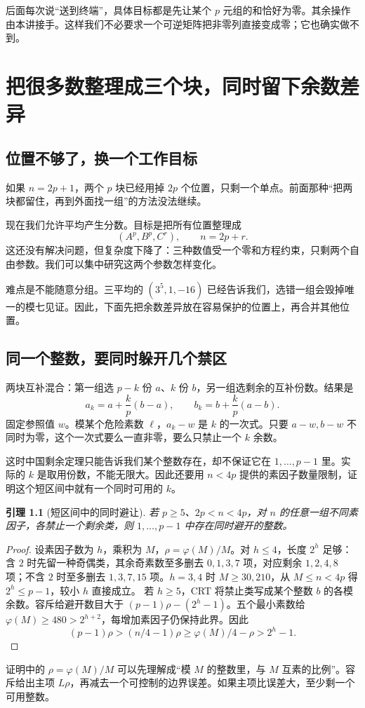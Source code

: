 \documentclass[11pt,a4paper,oneside,openany]{book}
\newtheorem{lemma}[theorem]{引理}
\theoremstyle{definition}
\numberwithin{equation}{chapter}
\begin{document}
后面每次说“送到终端”，具体目标都是先让某个 $p$ 元组的和恰好为零。其余操作由本讲接手。这样我们不必要求一个可逆矩阵把非零列直接变成零；它也确实做不到。

\chapter{把很多数整理成三个块，同时留下余数差异}\label{sec:compression}
\section{位置不够了，换一个工作目标}
如果 $n=2p+1$，两个 $p$ 块已经用掉 $2p$ 个位置，只剩一个单点。前面那种“把两块都留住，再到外面找一组”的方法没法继续。

现在我们允许平均产生分数。目标是把所有位置整理成
\[(A^p,B^p,C^r),\qquad n=2p+r.
\]
这还没有解决问题，但复杂度下降了：三种数值受一个零和方程约束，只剩两个自由参数。我们可以集中研究这两个参数怎样变化。

难点是不能随意分组。三平均的 $(3^5,1,-16)$ 已经告诉我们，选错一组会毁掉唯一的模七见证。因此，下面先把余数差异放在容易保护的位置上，再合并其他位置。

\section{同一个整数，要同时躲开几个禁区}
两块互补混合：第一组选 $p-k$ 份 $a$、$k$ 份 $b$，另一组选剩余的互补份数。结果是
\begin{equation}\label{eq:mix-pair}
a_k=a+\frac{k}{p}(b-a),\qquad b_k=b+\frac{k}{p}(a-b).
\end{equation}
固定参照值 $w$。模某个危险素数 $\ell$，$a_k-w$ 是 $k$ 的一次式。只要 $a-w,b-w$ 不同时为零，这个一次式要么一直非零，要么只禁止一个 $k$ 余数。

这时中国剩余定理只能告诉我们某个整数存在，却不保证它在 $1,\ldots,p-1$ 里。实际的 $k$ 是取用份数，不能无限大。因此还要用 $n<4p$ 提供的素因子数量限制，证明这个短区间中就有一个同时可用的 $k$。
\begin{lemma}[短区间中的同时避让]\label{lem:short-choice}
若 $p\ge5$、$2p<n<4p$，对 $n$ 的任意一组不同素因子，各禁止一个剩余类，则 $1,\ldots,p-1$ 中存在同时避开的整数。
\end{lemma}
\begin{proof}
设素因子数为 $h$，乘积为 $M$，$\rho=\varphi(M)/M$。对 $h\le4$，长度 $2^h$ 足够：含 $2$ 时先留一种奇偶类，其余奇素数至多删去 $0,1,3,7$ 项，对应剩余 $1,2,4,8$ 项；不含 $2$ 时至多删去 $1,3,7,15$ 项。$h=3,4$ 时 $M\ge30,210$，从 $M\le n<4p$ 得 $2^h\le p-1$，较小 $h$ 直接成立。
若 $h\ge5$，CRT 将禁止类写成某个整数 $b$ 的各模余数。容斥给避开数目大于 $(p-1)\rho-(2^h-1)$。五个最小素数给 $\varphi(M)\ge480>2^{h+2}$，每增加素因子仍保持此界。因此
\[(p-1)\rho>(n/4-1)\rho\ge\varphi(M)/4-\rho>2^h-1.
\]
\end{proof}
证明中的 $\rho=\varphi(M)/M$ 可以先理解成“模 $M$ 的整数里，与 $M$ 互素的比例”。容斥给出主项 $L\rho$，再减去一个可控制的边界误差。如果主项比误差大，至少剩一个可用整数。
\end{document}

